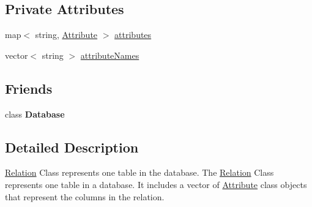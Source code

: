 \subsection*{Private Attributes}
\begin{DoxyCompactItemize}
\item 
map$<$ string, \hyperlink{class_attribute}{Attribute} $>$ \hyperlink{class_relation_ad505b043cf529432345433e6d4e2ded9}{attributes}
\item 
vector$<$ string $>$ \hyperlink{class_relation_ace8c91beafd208dcf6469b9b2425ecf7}{attribute\-Names}
\end{DoxyCompactItemize}
\subsection*{Friends}
\begin{DoxyCompactItemize}
\item 
\hypertarget{class_relation_a6efef52d7a939622bbc934ff6b90ffe0}{class {\bfseries Database}}\label{class_relation_a6efef52d7a939622bbc934ff6b90ffe0}

\end{DoxyCompactItemize}


\subsection{Detailed Description}
\hyperlink{class_relation}{Relation} Class represents one table in the database. The \hyperlink{class_relation}{Relation} Class represents one table in a database. It includes a vector of \hyperlink{class_attribute}{Attribute} class objects that represent the columns in the relation. 

